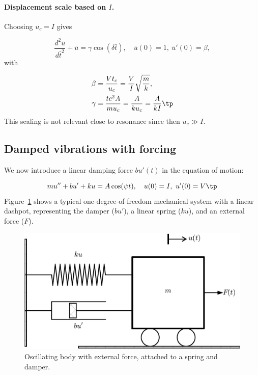 \documentclass[graybox,envcountchap,sectrefs,final]{svmonodo}
\begin{document}
\paragraph{Displacement scale based on $I$.}
Choosing $u_c=I$ gives

\begin{equation}
\frac{d^2\bar u}{d\bar t^2} + \bar u =
\gamma\cos(\delta\bar t),
\quad \bar u(0)=1,\ \bar u'(0)=\beta,
\label{sec:scale:vib:undamped:F:model:scaled5}
\end{equation}
with

\begin{align}
\beta  &= \frac{Vt_c}{u_c} = \frac{V}{I}\sqrt{\frac{m}{k}},\\ 
\gamma & = \frac{tc^2A}{mu_c} = \frac{A}{ku_c} = \frac{A}{kI} \tp
\end{align}
This scaling is not relevant close to resonance since then $u_c\gg I$.


\subsection{Damped vibrations with forcing}
\label{sec:scale:vib:damped:F}

We now introduce a linear damping force $bu'(t)$ in the equation of motion:

\begin{equation}
mu'' + bu' + ku = A\cos(\psi t),\quad u(0)=I,\ u'(0)=V\tp
\label{sec:scale:vib:damped:F:model}
\end{equation}
Figure~\ref{sec:scale:vib:damped:sketch} shows a typical
one-degree-of-freedom mechanical system with a linear dashpot, representing
the damper ($bu'$), a linear spring ($ku$), and an external force ($F$).


\begin{figure}[!ht]  %
  \centerline{\includegraphics[width=0.6\linewidth]{fig-scaling/oscillator.pdf}}
  \caption{
  Oscillating body with external force, attached to a spring and damper. \label{sec:scale:vib:damped:sketch}
  }
\end{figure}
\end{document}
